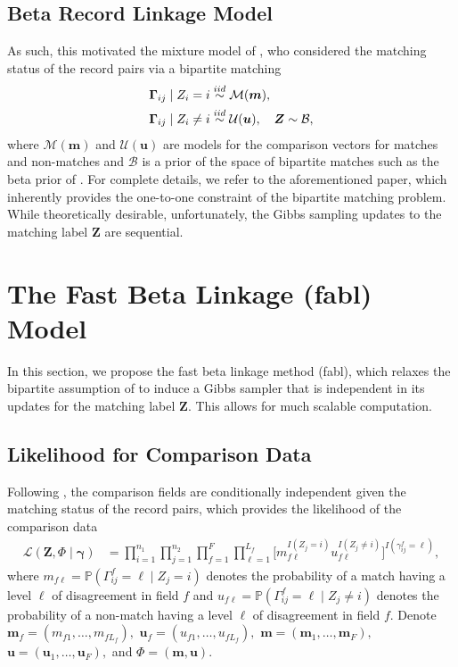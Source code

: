 \documentclass[ba]{imsart}
\newcommand{\bem}{\boldsymbol{m}}
\newcommand{\bu}{\boldsymbol{u}}
\newcommand{\bZ}{\boldsymbol{Z}}
\newcommand{\bGamma}{\boldsymbol{\Gamma}}
\newcommand{\bgamma}{\boldsymbol{\gamma}}
\begin{document}
\subsection{Beta Record Linkage Model}
\label{sec:brl}
As such, this motivated the mixture model of \cite{sadinle_bayesian_2017}, who considered the matching status of the record pairs via a bipartite matching
\begin{align}
\bGamma_{ij} \mid Z_i = i &\stackrel{iid}{\sim} \mathcal{M}(\bem), \notag \\
\bGamma_{ij} \mid Z_i \neq i &\stackrel{iid}{\sim} \mathcal{U}(\bu), \quad \bZ \sim \mathcal{B},
\end{align}
where $\mathcal{M}(\bem)$ and $\mathcal{U}(\bu)$ are models for the comparison vectors for matches and non-matches and $\mathcal{B}$ is a prior of the space of bipartite matches such as the beta prior of \cite{sadinle_bayesian_2017}. For complete details, we refer to the aforementioned paper, which inherently provides the one-to-one constraint of the bipartite matching problem. While theoretically desirable, unfortunately, the Gibbs sampling updates to the matching label $\bZ$ are sequential. 

\section{The Fast Beta Linkage (fabl) Model}
\label{sec:fabl}
In this section, we propose the fast beta linkage method (fabl), which relaxes the bipartite assumption of \cite{sadinle_bayesian_2017} to induce a Gibbs sampler that is independent in its updates for the matching label $\bZ.$ This allows for much scalable computation. 


\subsection{Likelihood for Comparison Data}
\label{sec:like}

Following \cite{sadinle_bayesian_2017}, the comparison fields are conditionally independent given the matching status of the record pairs, which provides the likelihood of the comparison data 
\begin{align}
\label{eqn:likelihood}
\mathcal{L}(\bZ, \Phi \mid \bgamma) &= \prod_{i=1}^{n_1} 
\prod_{j=1}^{n_2}
\prod_{f=1}^{F}
\prod_{\ell=1}^{L_f}
\bigg[
m_{f\ell}^{
I(Z_j = i)
}
u_{f\ell}^{
I(Z_j \neq i)
}
\bigg]^{
I(\gamma^f_{ij} = \ell)
},
\end{align}
where
$
m_{f\ell}
= \mathbb{P}(\Gamma_{ij}^f = \ell \mid Z_j = i )
$
denotes the probability of a match having a level $\ell$ of disagreement in field $f$ and 
$
u_{f\ell}
= \mathbb{P}(\Gamma_{ij}^f = \ell \mid Z_j \neq i )
$
denotes the probability of a non-match having a level $\ell$ of disagreement in field $f.$
Denote $\bem_f = (m_{f1}, \ldots, m_{fL_f}),$  $\bu_f = (u_{f1}, \ldots, u_{fL_f}),$ $\bem = (\bem_1, \ldots, \bem_F),$
$\bu = (\bu_1, \ldots, \bu_F),$ and $\Phi = (\bem, \bu).$
\end{document}
